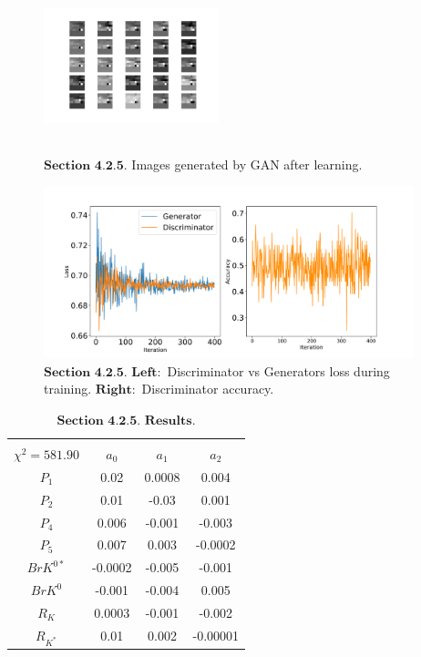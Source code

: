 \documentclass[a4paper,fleqn]{cas-dc}
\begin{document}
\begin{figure}
	\centering
	\includegraphics[width=0.45\textwidth,height=5cm]{images/learntimages.pdf}
	\caption{\(\textbf{Section 4.2.5}.\) Images generated by GAN after learning.}
	\label{FIG:learntimages}
\end{figure}
\begin{figure}
	\centering
	\includegraphics[width=\textwidth,height=5cm]{images/gendis3.pdf}
	\caption{\(\textbf{Section 4.2.5}.\) \(\textbf{Left}: \) Discriminator vs Generators loss during training. \(\textbf{Right}: \) Discriminator accuracy.}
	\label{FIG:gendis3}
\end{figure}
\newline
\begin{table}
\begin{tabular}{ |c|c|c|c|  } 
	\hline
	\small
	\makecell{\(C_9 = 0.38\), \(C_{10} = 5.9\) \\ \(\chi^2 = 581.90 \)}\normalsize
	& \textbf{\(a_0\)} & \textbf{\(a_1\)} & \textbf{\(a_2\)}\\
	\hline
	\(P_1\) & 0.02 & 0.0008 &  0.004 \\
	\hline
	\(P_2\) & 0.01 & -0.03 & 0.001 \\	
	\hline
	\(P_4\) & 0.006 & -0.001 &	-0.003 \\
	\hline
	\(P_5\) & 0.007 &   0.003 &   -0.0002 \\		
	\hline
	\(BrK^{0*}\) & -0.0002 & -0.005 & -0.001 \\		
	\hline
	\(BrK^{0}\) & -0.001 & -0.004 & 0.005 \\		
	\hline	
	\(R_{K}\) & 0.0003 & -0.001 & -0.002 \\
	\hline	
	\(R_{K^*}\) & 0.01 & 0.002 & -0.00001 \\		
	\hline
\end{tabular}
\caption{\label{tab:GAN4Results} \(\textbf{Section 4.2.5. Results.}\) }
\end{table}
\end{document}
